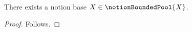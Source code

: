 

\begin{proposition}\label{notion_bound_cannot_discover_its_own_name}
    There exists a notion base $X\in\notionBoundedPool{X}$.
\end{proposition}
\begin{proof}
    Follows.
\end{proof}
